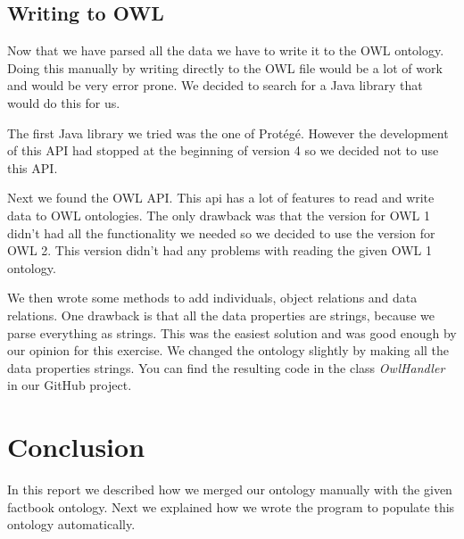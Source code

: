 \documentclass{article}
\begin{document}
\subsection{Writing to OWL}
\label{sec:writ_owl}
Now that we have parsed all the data we have to write it to the OWL ontology. Doing this manually by writing directly to the OWL file would be a lot of work and would be very error prone. We decided to search for a Java library that would do this for us.\par
The first Java library we tried was the one of Prot\'eg\'e. However the development of this API had stopped at the beginning of version 4 so we decided not to use this API.\par
Next we found the OWL API\cite{owlapi}. This api has a lot of features to read and write data to OWL ontologies. The only drawback was that the version for OWL 1 didn't had all the functionality we needed so we decided to use the version for OWL 2. This version didn't had any problems with reading the given OWL 1 ontology.\par
We then wrote some methods to add individuals, object relations and data relations. One drawback is that all the data properties are strings, because we parse everything as strings. This was the easiest solution and was good enough by our opinion for this exercise. We changed the ontology slightly by making all the data properties strings. You can find the resulting code in the class \textit{OwlHandler} in our GitHub project\cite{githubproject}.
\section{Conclusion}
In this report we described how we merged our ontology manually with the given factbook ontology. Next we explained how we wrote the program to populate this ontology automatically.
\printbibliography
\end{document}
